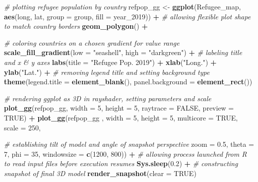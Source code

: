 \documentclass[
]{article}
\newenvironment{Shaded}{\begin{snugshade}}{\end{snugshade}}
\newcommand{\CommentTok}[1]{\textcolor[rgb]{0.56,0.35,0.01}{\textit{#1}}}
\newcommand{\DataTypeTok}[1]{\textcolor[rgb]{0.13,0.29,0.53}{#1}}
\newcommand{\DecValTok}[1]{\textcolor[rgb]{0.00,0.00,0.81}{#1}}
\newcommand{\FloatTok}[1]{\textcolor[rgb]{0.00,0.00,0.81}{#1}}
\newcommand{\KeywordTok}[1]{\textcolor[rgb]{0.13,0.29,0.53}{\textbf{#1}}}
\newcommand{\NormalTok}[1]{#1}
\newcommand{\OperatorTok}[1]{\textcolor[rgb]{0.81,0.36,0.00}{\textbf{#1}}}
\newcommand{\OtherTok}[1]{\textcolor[rgb]{0.56,0.35,0.01}{#1}}
\newcommand{\StringTok}[1]{\textcolor[rgb]{0.31,0.60,0.02}{#1}}
\begin{document}
\begin{Shaded}
\begin{Highlighting}[]
\CommentTok{# plotting refugee population by country}
\NormalTok{refpop_gg <-}\StringTok{ }\KeywordTok{ggplot}\NormalTok{(Refugee_map, }\KeywordTok{aes}\NormalTok{(long, lat, }\DataTypeTok{group =}\NormalTok{ group, }\DataTypeTok{fill =}\NormalTok{ year_}\DecValTok{2019}\NormalTok{)) }\OperatorTok{+}\StringTok{ }
\StringTok{  }
\CommentTok{# allowing flexible plot shape to match country borders}
\StringTok{  }\KeywordTok{geom_polygon}\NormalTok{() }\OperatorTok{+}\StringTok{ }

\CommentTok{# coloring countries on a chosen gradient for value range}
\StringTok{  }\KeywordTok{scale_fill_gradient}\NormalTok{(}\DataTypeTok{low =} \StringTok{"seashell"}\NormalTok{, }\DataTypeTok{high =} \StringTok{"darkgreen"}\NormalTok{) }\OperatorTok{+}\StringTok{ }
\StringTok{ }
\CommentTok{# labeling title and x & y axes}
\StringTok{  }\KeywordTok{labs}\NormalTok{(}\DataTypeTok{title =} \StringTok{"Refugee Pop. 2019"}\NormalTok{) }\OperatorTok{+}\StringTok{ }
\StringTok{  }\KeywordTok{xlab}\NormalTok{(}\StringTok{"Long."}\NormalTok{) }\OperatorTok{+}\StringTok{ }
\StringTok{  }\KeywordTok{ylab}\NormalTok{(}\StringTok{"Lat."}\NormalTok{) }\OperatorTok{+}\StringTok{ }
\StringTok{ }
\CommentTok{# removing legend title and setting background type}
\StringTok{   }\KeywordTok{theme}\NormalTok{(}\DataTypeTok{legend.title =} \KeywordTok{element_blank}\NormalTok{(), }
        \DataTypeTok{panel.background =} \KeywordTok{element_rect}\NormalTok{())}

\CommentTok{# rendering ggplot as 3D in rayshader, setting parameters and scale}
\KeywordTok{plot_gg}\NormalTok{(refpop_gg, }\DataTypeTok{width =} \DecValTok{5}\NormalTok{, }\DataTypeTok{height =} \DecValTok{5}\NormalTok{, }\DataTypeTok{raytrace =} \OtherTok{FALSE}\NormalTok{, }\DataTypeTok{preview =} \OtherTok{TRUE}\NormalTok{) }\OperatorTok{+}\StringTok{ }
\StringTok{  }\KeywordTok{plot_gg}\NormalTok{(refpop_gg , }\DataTypeTok{width =} \DecValTok{5}\NormalTok{, }\DataTypeTok{height =} \DecValTok{5}\NormalTok{, }\DataTypeTok{multicore =} \OtherTok{TRUE}\NormalTok{, }\DataTypeTok{scale =} \DecValTok{250}\NormalTok{,}
                                                                                      
\CommentTok{# establishing tilt of model and angle of snapshot perspective}
        \DataTypeTok{zoom =} \FloatTok{0.5}\NormalTok{, }\DataTypeTok{theta =} \DecValTok{7}\NormalTok{, }\DataTypeTok{phi =} \DecValTok{35}\NormalTok{, }\DataTypeTok{windowsize =} \KeywordTok{c}\NormalTok{(}\DecValTok{1200}\NormalTok{, }\DecValTok{800}\NormalTok{)) }\OperatorTok{+}\StringTok{ }
\StringTok{  }
\CommentTok{# allowing process launched from R to read input files before execution resumes}
\StringTok{  }\KeywordTok{Sys.sleep}\NormalTok{(}\FloatTok{0.2}\NormalTok{) }\OperatorTok{+}\StringTok{ }
\StringTok{  }
\CommentTok{# constructing snapshot of final 3D model}
\StringTok{  }\KeywordTok{render_snapshot}\NormalTok{(}\DataTypeTok{clear =} \OtherTok{TRUE}\NormalTok{) }
\end{Highlighting}
\end{Shaded}
\end{document}
